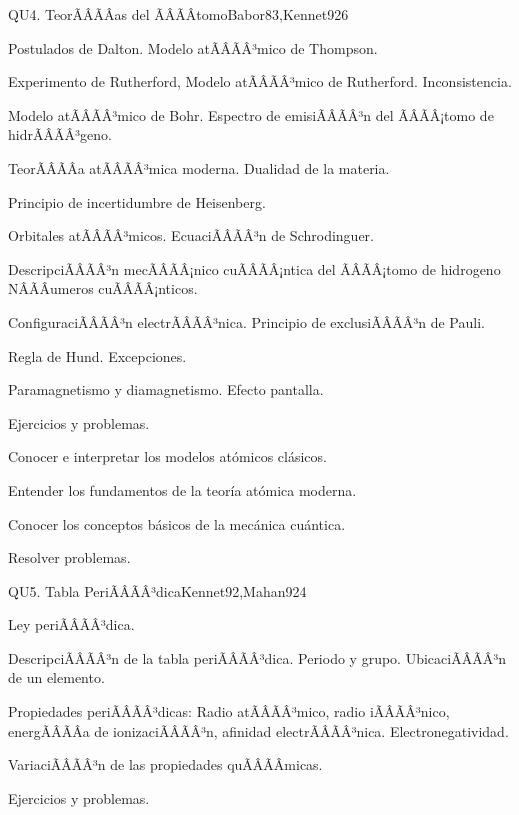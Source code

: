 \begin{sumilla}
\begin{unit}{QU4. TeorÃÂÃÂ­as del ÃÂÃÂtomo}{Babor83,Kennet92}{6}
\begin{topicos}
      \item Postulados de Dalton. Modelo atÃÂÃÂ³mico de Thompson.
      \item Experimento de Rutherford, Modelo atÃÂÃÂ³mico de Rutherford. Inconsistencia.
      \item Modelo atÃÂÃÂ³mico de Bohr. Espectro de emisiÃÂÃÂ³n del ÃÂÃÂ¡tomo de hidrÃÂÃÂ³geno.
      \item TeorÃÂÃÂ­a atÃÂÃÂ³mica moderna. Dualidad de la materia.
      \item Principio de incertidumbre de Heisenberg.
      \item Orbitales atÃÂÃÂ³micos. EcuaciÃÂÃÂ³n de Schrodinguer.
      \item DescripciÃÂÃÂ³n mecÃÂÃÂ¡nico cuÃÂÃÂ¡ntica del ÃÂÃÂ¡tomo de hidrogeno N\ÃÂÃÂumeros cuÃÂÃÂ¡nticos.
      \item ConfiguraciÃÂÃÂ³n electrÃÂÃÂ³nica. Principio de exclusiÃÂÃÂ³n de Pauli.
      \item Regla de Hund. Excepciones.
      \item Paramagnetismo y diamagnetismo. Efecto pantalla.
      \item Ejercicios y problemas.
   \end{topicos}

   \begin{objetivos}
      \item Conocer e interpretar los modelos at\'omicos cl\'asicos.
      \item Entender los fundamentos de la teor\'ia at\'omica moderna.
      \item Conocer los conceptos b\'asicos de la mec\'anica cu\'antica.
      \item Resolver problemas.
   \end{objetivos}
\end{unit}

\begin{unit}{QU5. Tabla PeriÃÂÃÂ³dica}{Kennet92,Mahan92}{4}
\begin{topicos}
	\item Ley periÃÂÃÂ³dica.
	\item DescripciÃÂÃÂ³n de la tabla periÃÂÃÂ³dica. Periodo y grupo. UbicaciÃÂÃÂ³n de un elemento.
	\item Propiedades periÃÂÃÂ³dicas: Radio atÃÂÃÂ³mico, radio iÃÂÃÂ³nico, energÃÂÃÂ­a de ionizaciÃÂÃÂ³n, afinidad electrÃÂÃÂ³nica. Electronegatividad.
	\item VariaciÃÂÃÂ³n de las propiedades quÃÂÃÂ­micas.
	\item Ejercicios y problemas.
   \end{topicos}


\end{unit}
\end{sumilla}
